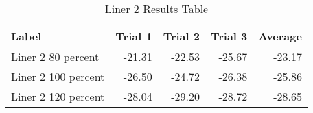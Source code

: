 \begin{table}[htbp]
\centering
\begin{tabular}{lrrrr}
\toprule
 Label & Trial 1 & Trial 2 & Trial 3 & Average \\
\midrule
 Liner 2 80 percent & -21.31 & -22.53 & -25.67 & -23.17 \\
 Liner 2 100 percent & -26.50 & -24.72 & -26.38 & -25.86 \\
 Liner 2 120 percent & -28.04 & -29.20 & -28.72 & -28.65 \\
\bottomrule
\end{tabular}
\caption{Liner 2 Results Table}
\label{fig:liner_2_results_table}
\end{table}
